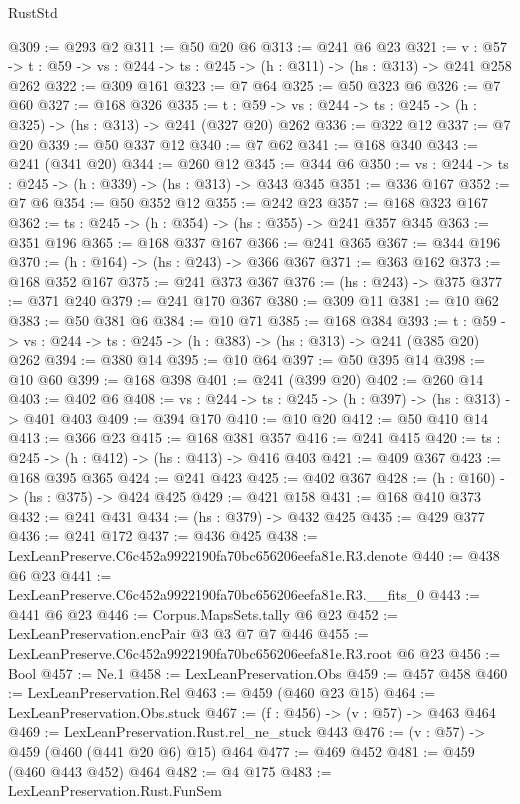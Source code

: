 \begin{lexlean}{RustStd}
\begin{coremodule}
@309 := @293 @2
@311 := @50 @20 @6
@313 := @241 @6 @23
@321 := {v : @57} ->
  {t : @59} -> {vs : @244} -> {ts : @245} -> (h : @311) -> (hs : @313) -> @241 @258 @262
@322 := @309 @161
@323 := @7 @64
@325 := @50 @323 @6
@326 := @7 @60
@327 := @168 @326
@335 := {t : @59} -> {vs : @244} -> {ts : @245} -> (h : @325) -> (hs : @313) -> @241 (@327 @20) @262
@336 := @322 @12
@337 := @7 @20
@339 := @50 @337 @12
@340 := @7 @62
@341 := @168 @340
@343 := @241 (@341 @20)
@344 := @260 @12
@345 := @344 @6
@350 := {vs : @244} -> {ts : @245} -> (h : @339) -> (hs : @313) -> @343 @345
@351 := @336 @167
@352 := @7 @6
@354 := @50 @352 @12
@355 := @242 @23
@357 := @168 @323 @167
@362 := {ts : @245} -> (h : @354) -> (hs : @355) -> @241 @357 @345
@363 := @351 @196
@365 := @168 @337 @167
@366 := @241 @365
@367 := @344 @196
@370 := (h : @164) -> (hs : @243) -> @366 @367
@371 := @363 @162
@373 := @168 @352 @167
@375 := @241 @373 @367
@376 := (hs : @243) -> @375
@377 := @371 @240
@379 := @241 @170 @367
@380 := @309 @11
@381 := @10 @62
@383 := @50 @381 @6
@384 := @10 @71
@385 := @168 @384
@393 := {t : @59} -> {vs : @244} -> {ts : @245} -> (h : @383) -> (hs : @313) -> @241 (@385 @20) @262
@394 := @380 @14
@395 := @10 @64
@397 := @50 @395 @14
@398 := @10 @60
@399 := @168 @398
@401 := @241 (@399 @20)
@402 := @260 @14
@403 := @402 @6
@408 := {vs : @244} -> {ts : @245} -> (h : @397) -> (hs : @313) -> @401 @403
@409 := @394 @170
@410 := @10 @20
@412 := @50 @410 @14
@413 := @366 @23
@415 := @168 @381 @357
@416 := @241 @415
@420 := {ts : @245} -> (h : @412) -> (hs : @413) -> @416 @403
@421 := @409 @367
@423 := @168 @395 @365
@424 := @241 @423
@425 := @402 @367
@428 := (h : @160) -> (hs : @375) -> @424 @425
@429 := @421 @158
@431 := @168 @410 @373
@432 := @241 @431
@434 := (hs : @379) -> @432 @425
@435 := @429 @377
@436 := @241 @172
@437 := @436 @425
@438 := LexLeanPreserve.C6c452a9922190fa70bc656206eefa81e.R3.denote
@440 := @438 @6 @23
@441 := LexLeanPreserve.C6c452a9922190fa70bc656206eefa81e.R3.__fits_0
@443 := @441 @6 @23
@446 := Corpus.MapsSets.tally @6 @23
@452 := LexLeanPreservation.encPair @3 @3 @7 @7 @446
@455 := LexLeanPreserve.C6c452a9922190fa70bc656206eefa81e.R3.root @6 @23
@456 := Bool
@457 := Ne.{1}
@458 := LexLeanPreservation.Obs
@459 := @457 @458
@460 := LexLeanPreservation.Rel
@463 := @459 (@460 @23 @15)
@464 := LexLeanPreservation.Obs.stuck
@467 := (f : @456) -> (v : @57) -> @463 @464
@469 := LexLeanPreservation.Rust.rel_ne_stuck @443
@476 := (v : @57) -> @459 (@460 (@441 @20 @6) @15) @464
@477 := @469 @452
@481 := @459 (@460 @443 @452) @464
@482 := @4 @175
@483 := LexLeanPreservation.Rust.FunSem

\end{coremodule}
\end{lexlean}
